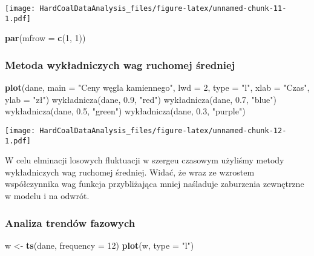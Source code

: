 \documentclass[
]{article}
\newenvironment{Shaded}{\begin{snugshade}}{\end{snugshade}}
\newcommand{\AttributeTok}[1]{\textcolor[rgb]{0.13,0.29,0.53}{#1}}
\newcommand{\DecValTok}[1]{\textcolor[rgb]{0.00,0.00,0.81}{#1}}
\newcommand{\FloatTok}[1]{\textcolor[rgb]{0.00,0.00,0.81}{#1}}
\newcommand{\FunctionTok}[1]{\textcolor[rgb]{0.13,0.29,0.53}{\textbf{#1}}}
\newcommand{\NormalTok}[1]{#1}
\newcommand{\OtherTok}[1]{\textcolor[rgb]{0.56,0.35,0.01}{#1}}
\newcommand{\StringTok}[1]{\textcolor[rgb]{0.31,0.60,0.02}{#1}}
\begin{document}
\texttt{[image: HardCoalDataAnalysis\_files/figure-latex/unnamed-chunk-11-1.pdf]}

\begin{Shaded}
\begin{Highlighting}[]
  \FunctionTok{par}\NormalTok{(}\AttributeTok{mfrow =} \FunctionTok{c}\NormalTok{(}\DecValTok{1}\NormalTok{, }\DecValTok{1}\NormalTok{))}
\end{Highlighting}
\end{Shaded}

\subsubsection{Metoda wykładniczych wag ruchomej
średniej}\label{metoda-wykux142adniczych-wag-ruchomej-ux15bredniej}

\begin{Shaded}
\begin{Highlighting}[]
\FunctionTok{plot}\NormalTok{(dane, }\AttributeTok{main =} \StringTok{"Ceny węgla kamiennego"}\NormalTok{, }\AttributeTok{lwd =} \DecValTok{2}\NormalTok{, }\AttributeTok{type =} \StringTok{"l"}\NormalTok{, }\AttributeTok{xlab =} \StringTok{"Czas"}\NormalTok{, }\AttributeTok{ylab =} \StringTok{"zł"}\NormalTok{)}
\NormalTok{wykładnicza(dane, }\FloatTok{0.9}\NormalTok{, }\StringTok{"red"}\NormalTok{)}
\NormalTok{wykładnicza(dane, }\FloatTok{0.7}\NormalTok{, }\StringTok{"blue"}\NormalTok{)}
\NormalTok{wykładnicza(dane, }\FloatTok{0.5}\NormalTok{, }\StringTok{"green"}\NormalTok{)}
\NormalTok{wykładnicza(dane, }\FloatTok{0.3}\NormalTok{, }\StringTok{"purple"}\NormalTok{)}
\end{Highlighting}
\end{Shaded}

\texttt{[image: HardCoalDataAnalysis\_files/figure-latex/unnamed-chunk-12-1.pdf]}

W celu elminacji losowych fluktuacji w szergeu czasowym użyliśmy metody
wykładniczych wag ruchomej średniej. Widać, że wraz ze wzrostem
współczynnika wag funkcja przybliżająca mniej naśladuje zaburzenia
zewnętrzne w modelu i na odwrót.

\subsubsection{Analiza trendów
fazowych}\label{analiza-trenduxf3w-fazowych}

\begin{Shaded}
\begin{Highlighting}[]
\NormalTok{w }\OtherTok{\textless{}{-}} \FunctionTok{ts}\NormalTok{(dane, }\AttributeTok{frequency =} \DecValTok{12}\NormalTok{)}
\FunctionTok{plot}\NormalTok{(w, }\AttributeTok{type =} \StringTok{"l"}\NormalTok{)}
\end{Highlighting}
\end{Shaded}
\end{document}

